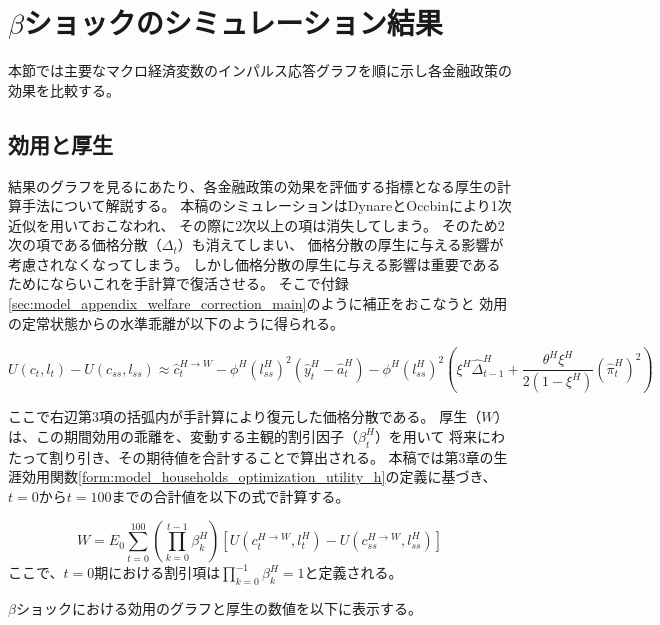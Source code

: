 
\section{\(\beta\)ショックのシミュレーション結果}
\label{sec:sec_results_beta_shock}
本節では主要なマクロ経済変数のインパルス応答グラフを順に示し各金融政策の効果を比較する。

\subsection{効用と厚生}
\label{sec:sec_results_beta_shock_welfare_eval}
結果のグラフを見るにあたり、各金融政策の効果を評価する指標となる厚生の計算手法について解説する。
本稿のシミュレーションはDynareとOccbinにより1次近似を用いておこなわれ、
その際に2次以上の項は消失してしまう。
そのため2次の項である価格分散（\(\Delta_t\)）も消えてしまい、
価格分散の厚生に与える影響が考慮されなくなってしまう。
しかし価格分散の厚生に与える影響は重要であるため\textcite{Woodford2003}にならいこれを手計算で復活させる。
そこで付録\ref{sec:model_appendix_welfare_correction_main}のように補正をおこなうと
効用の定常状態からの水準乖離が以下のように得られる。



\begin{equation}
U(c_t,l_t)-U(c_{ss},l_{ss})\approx\hat{c}_t^{H\to W}-\phi^H(l_{ss}^H)^2(\hat{y}_t^H-\hat{a}_t^H)-\phi^H(l_{ss}^H)^2\left(\xi^H\hat{\Delta}_{t-1}^H+\frac{\theta^H\xi^H}{2(1-\xi^H)}(\hat{\pi}_t^H)^2\right)
\label{form:sec_results_beta_shock_period_utility}
\end{equation}

ここで右辺第3項の括弧内が手計算により復元した価格分散である。
厚生（\(W\)）は、この期間効用の乖離を、変動する主観的割引因子（\(\beta_t^H\)）を用いて
将来にわたって割り引き、その期待値を合計することで算出される。
本稿では第3章の生涯効用関数\eqref{form:model_households_optimization_utility_h}の定義に基づき、
\(t=0\)から\(t=100\)までの合計値を以下の式で計算する。

\begin{equation}
W=E_0\sum_{t=0}^{100}\left(\prod_{k=0}^{t-1}\beta_k^H\right)\left[U(c_t^{H\to W},l_t^H)-U(c_{ss}^{H\to W},l_{ss}^H)\right]
\label{form:sec_results_beta_shock_social_welfare}
\end{equation}
ここで、\(t=0\)期における割引項は\(\prod_{k=0}^{-1}\beta_k^H=1\)と定義される。

\(\beta\)ショックにおける効用のグラフと厚生の数値を以下に表示する。

